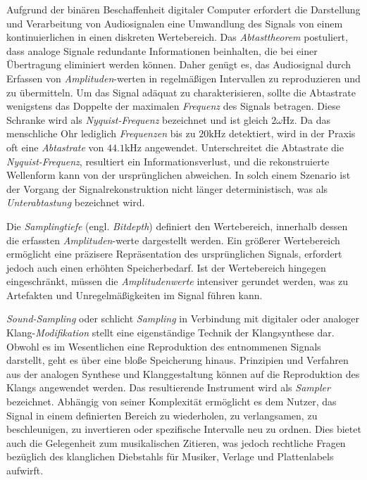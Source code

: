 \documentclass[
  a4paper,  %
  twoside,  %
  bibliography=totoc,
  headsepline,
  cleardoublepage=empty,
  parskip=half,
  draft=false
]{scrbook}
\begin{document}
Aufgrund der binären Beschaffenheit digitaler Computer erfordert die Darstellung und Verarbeitung von Audiosignalen eine Umwandlung des Signals von einem kontinuierlichen in einen diskreten Wertebereich. Das \emph{Abtasttheorem} postuliert, dass analoge Signale redundante Informationen beinhalten, die bei einer Übertragung eliminiert werden können. Daher genügt es, das Audiosignal durch Erfassen von \emph{Amplituden}-werten in regelmäßigen Intervallen zu reproduzieren und zu übermitteln. Um das Signal adäquat zu charakterisieren, sollte die Abtastrate wenigstens das Doppelte der maximalen \emph{Frequenz} des Signals betragen. Diese Schranke wird als \emph{Nyquist-Frequenz} bezeichnet und ist gleich $2 \omega \mathrm{Hz}$. Da das menschliche Ohr lediglich \emph{Frequenzen} bis zu $20 \text{kHz}$ detektiert, wird in der Praxis oft eine \emph{Abtastrate} von $44.1\text{kHz}$ angewendet. Unterschreitet die Abtastrate die \emph{Nyquist-Frequenz}, resultiert ein Informationsverlust, und die rekonstruierte Wellenform kann von der ursprünglichen abweichen. In solch einem Szenario ist der Vorgang der Signalrekonstruktion nicht länger deterministisch, was als \emph{Unterabtastung} bezeichnet wird. \cite{lai_practical_2004, shannon_communication_1949, ruschkowski_elektronische_2019}

Die \emph{Samplingtiefe} (engl. \emph{Bitdepth}) definiert den Wertebereich, innerhalb dessen die erfassten \emph{Amplituden}-werte dargestellt werden. Ein größerer Wertebereich ermöglicht eine präzisere Repräsentation des ursprünglichen Signals, erfordert jedoch auch einen erhöhten Speicherbedarf. Ist der Wertebereich hingegen eingeschränkt, müssen die \emph{Amplitudenwerte} intensiver gerundet werden, was zu Artefakten und Unregelmäßigkeiten im Signal führen kann. \cite{thompson_understanding_2005}

\emph{Sound-Sampling} oder schlicht \emph{Sampling} in Verbindung mit digitaler oder analoger Klang-\emph{Modifikation} stellt eine eigenständige Technik der Klangsynthese dar. Obwohl es im Wesentlichen eine Reproduktion des entnommenen Signals darstellt, geht es über eine bloße Speicherung hinaus. Prinzipien und Verfahren aus der analogen Synthese und Klanggestaltung können auf die Reproduktion des Klangs angewendet werden. Das resultierende Instrument wird als \emph{Sampler} bezeichnet. Abhängig von seiner Komplexität ermöglicht es dem Nutzer, das Signal in einem definierten Bereich zu wiederholen, zu verlangsamen, zu beschleunigen, zu invertieren oder spezifische Intervalle neu zu ordnen. Dies bietet auch die Gelegenheit zum musikalischen Zitieren, was jedoch rechtliche Fragen bezüglich des klanglichen Diebstahls für Musiker, Verlage und Plattenlabels aufwirft. \cite{russ_sound_2009, ruschkowski_elektronische_2019, katz_capturing_2010}
\end{document}
